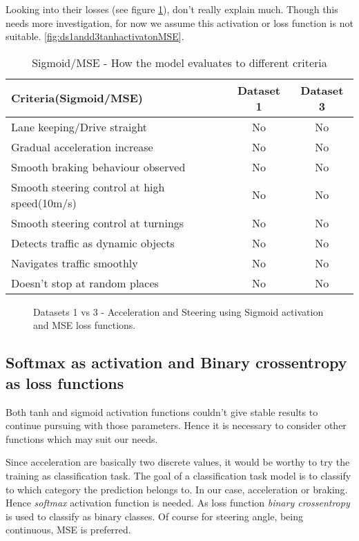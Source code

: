 Looking into their losses (see figure \ref{fig:ds1andd3SigactivatonMSE}), don't really
explain much. Though this needs more investigation, for now we assume this activation or
loss function is not suitable.
\ref{fig:ds1andd3tanhactivatonMSE}.
\begin{table}[h]
    \centering
\begin{tabular}{lcc}
    \toprule
    Criteria(Sigmoid/MSE) & Dataset 1 & Dataset 3 \\\midrule
    Lane keeping/Drive straight  & No & No  \\
    Gradual acceleration increase & No & No\\
    Smooth braking behaviour observed & No & No \\
    Smooth steering control at high speed(10m/s) & No & No \\
    Smooth steering control at turnings & No & No\\
    Detects traffic as dynamic objects & No & No\\
    Navigates traffic smoothly & No & No\\
    Doesn't stop at random places & No & No \\\bottomrule
\end{tabular}
\caption{Sigmoid/MSE - How the model evaluates to different criteria}
\label{table:sigmse}
\end{table}

\begin{figure}[h]
	\centering
    \def\svgwidth{\textwidth}
    
    \caption{Datasets 1 vs 3 - Acceleration and Steering using Sigmoid activation and MSE loss
    functions.}
    \label{fig:ds1andd3SigactivatonMSE}
\end{figure}

\subsection{Softmax as activation and Binary crossentropy as loss functions}
Both tanh and sigmoid activation functions couldn't give stable results to continue
pursuing with those parameters. Hence it is necessary to consider other functions which
may suit our needs.

Since acceleration are basically two discrete values, it would be worthy to try the
training as classification task. The goal of a classification task model is to classify to
which category the prediction belongs to. In our case, acceleration or braking. Hence
\textit{softmax} activation function is needed. As loss function \textit{binary
crossentropy} is used to classify as binary classes. Of course for steering angle,
being continuous, MSE is preferred.

